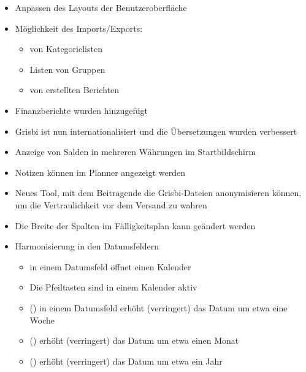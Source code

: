 \begin{itemize}
	\item Anpassen des Layouts der Benutzeroberfläche%
	\item Möglichkeit des Imports/Exports:%
		\begin{itemize}
		\item[\textopenbullet] von Kategorielisten%
		\item[\textopenbullet] Listen von Gruppen%
		\item[\textopenbullet] von erstellten Berichten%
		\end{itemize}	
	\item Finanzberichte wurden hinzugefügt%
	\item Grisbi ist nun internationalisiert und die Übersetzungen wurden verbessert%
	\item Anzeige von Salden in mehreren Währungen im Startbildschirm%
	\item Notizen können im Planner angezeigt werden%
	\item Neues Tool, mit dem Beitragende die Grisbi-Dateien anonymisieren können, um die Vertraulichkeit vor dem Versand zu wahren%
	\item Die Breite der Spalten im Fälligkeitsplan kann geändert werden%
	\item Harmonisierung in den Datumsfeldern%
		\begin{itemize}
		\item[\textopenbullet]  in einem Datumsfeld öffnet einen Kalender%
		\item[\textopenbullet] Die Pfeiltasten sind in einem Kalender aktiv%
		\item[\textopenbullet]  () in einem Datumsfeld erhöht (verringert) das Datum um etwa eine Woche%
		\item[\textopenbullet]  () erhöht (verringert) das Datum um etwa einen Monat%
		\item[\textopenbullet]  () erhöht (verringert) das Datum um etwa ein Jahr%
		\end{itemize}	
\end{itemize}

